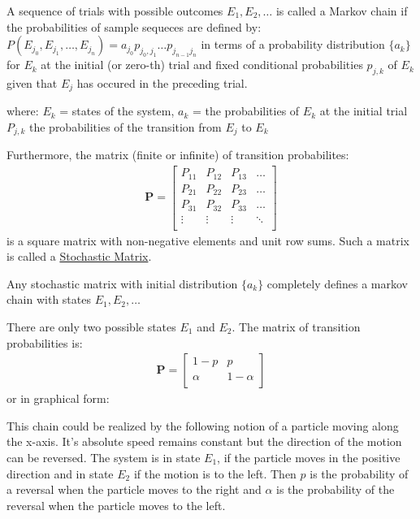 
\begin{definition}
A sequence of trials with possible outcomes $E_1, E_2, \dots$ is called a Markov chain if the probabilities of sample sequeces are defined by: 
$ P(E_{j_0}, E_{j_1}, \dots , E_{j_n}) = a_{j_0}p_{j_0, j_1} \dots p_{j_{n-1} j_n}$ in terms of a probability distribution $\{a_k\}$ for $E_k$ at the initial (or zero-th) trial and fixed conditional probabilities $p_{j, k}$ of $E_k$ given that $E_j$ has occured in the preceding trial.
\end{definition}
where: $E_k$ = states of the system, $a_k$ = the probabilities of $E_k$ at the initial trial $P_{j, k}$ the probabilities of the transition from $E_j$ to $E_k$

Furthermore, the matrix (finite or infinite) of transition probabilites: 
\begin{align*}
    \mathbf{P} = \begin{bmatrix} 
                    P_{11} & P_{12} & P_{13} & \dots \\
                    P_{21} & P_{22} & P_{23} & \dots \\
                    P_{31} & P_{32} & P_{33} & \dots \\
                    \vdots & \vdots & \vdots & \ddots \\
                \end{bmatrix}
\end{align*}
is a square matrix with non-negative elements and unit row sums. Such a matrix is called a \underline{Stochastic Matrix}.

Any stochastic matrix with initial distribution $\{a_k\}$ completely defines a markov chain with states $E_1, E_2, \dots$

\begin{example}
There are only two possible states $E_1$ and $E_2$. The matrix of transition probabilities is: 
\begin{align}
    \mathbf{P} = \begin{bmatrix} 
                 1 - p & p \\
                 \alpha & 1 - \alpha \\
                 \end{bmatrix}
\end{align}
or in graphical form: 
\end{example}

\begin{remark}
This chain could be realized by the following notion of a particle moving along the x-axis. 
It's absolute speed remains constant but the direction of the motion can be reversed. 
The system is in state $E_1$, if the particle moves in the positive direction and in state $E_2$ if the motion is to the left.
Then $p$ is the probability of a reversal when the particle moves to the right and $\alpha$ is the probability of the reversal when the particle moves to the left.
\end{remark}

